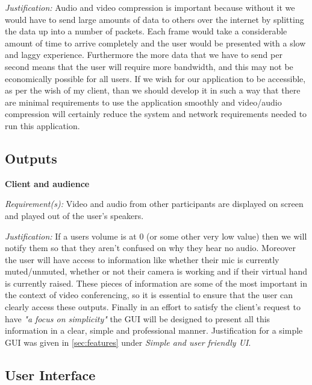 \textit{Justification:}
Audio and video compression is important because 
without it we would have to send large amounts
of data to others over the internet by splitting
the data up into a number of packets. Each frame
would take a considerable amount of time to arrive
completely and the user would be presented with a
slow and laggy experience. Furthermore the more
data that we have to send per second means that 
the user will require more bandwidth, and this may
not be economically possible for all users. If we 
wish for our application to be accessible, as per 
the wish of my client, than we should develop it in 
such a way that there are minimal requirements
to use the application smoothly and video/audio
compression will certainly reduce the
system and network requirements needed to run 
this application.
\\ \vspace{0.2cm}

\subsection{Outputs}

\textsf{\bfseries Client and audience} \\ \vspace{0.1cm}

\textit{Requirement(s):} Video and audio from other participants
are displayed on screen and played out of the user's speakers.\\ \vspace{0.1cm}

\textit{Justification:}
 If a users volume is at 0 (or some 
other very low value) then we will 
notify them so that they aren't confused on why they hear no 
audio. Moreover the user will have access to 
information like whether their mic is currently muted/unmuted,
whether or not their camera is working and if their virtual 
hand is currently raised.
These pieces of information are
some of the most important in the context of video
conferencing, so it is essential to ensure that the user can 
clearly access these outputs. Finally in an effort to satisfy
the client's request to have \textit{"a focus on simplicity"}
the GUI will be designed to present all this information in a
clear, simple and professional manner. Justification for a
simple GUI was given in \ref{sec:features} under 
\textit{Simple and user friendly UI}.

\subsection{User Interface}
\label{sec:ui}


